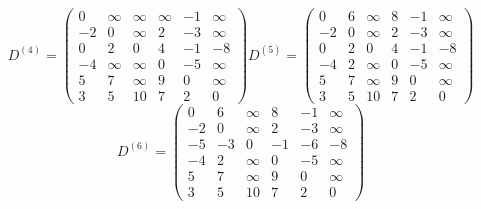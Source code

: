 \documentclass{article}
\begin{document}
  \[
D^{(4)}=
  \begin{pmatrix}
    0 & \infty & \infty & \infty & -1 & \infty \\
    -2 & 0 & \infty & 2 & -3 & \infty \\
    0 & 2 & 0 & 4 & -1 & -8 \\
    -4 & \infty & \infty & 0 & -5 & \infty \\
    5 & 7 & \infty & 9 & 0 & \infty \\
    3 & 5 & 10 & 7 & 2 & 0
  \end{pmatrix}
D^{(5)}=
  \begin{pmatrix}
    0 & 6 & \infty & 8 & -1 & \infty \\
    -2 & 0 & \infty & 2 & -3 & \infty \\
    0 & 2 & 0 & 4 & -1 & -8 \\
    -4 & 2 & \infty & 0 & -5 & \infty \\
    5 & 7 & \infty & 9 & 0 & \infty \\
    3 & 5 & 10 & 7 & 2 & 0
  \end{pmatrix}
  \]
  \[
D^{(6)}=
  \begin{pmatrix}
    0 & 6 & \infty & 8 & -1 & \infty \\
    -2 & 0 & \infty & 2 & -3 & \infty \\
    -5 & -3 & 0 & -1 & -6 & -8 \\
    -4 & 2 & \infty & 0 & -5 & \infty \\
    5 & 7 & \infty & 9 & 0 & \infty \\
    3 & 5 & 10 & 7 & 2 & 0
  \end{pmatrix}
\]

\newpage
\end{document}
